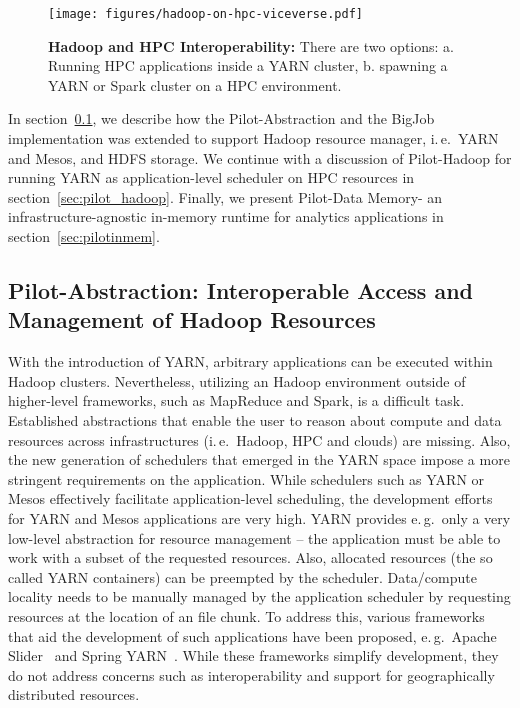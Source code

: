 \documentclass{sig-alternate}
\newcommand{\pilot}{Pilot\xspace}
\newcommand{\pilotdatainmem}{Pilot-Data Memory\xspace}
\begin{document}
\begin{figure}[t]
    \centering
    \texttt{[image: figures/hadoop-on-hpc-viceverse.pdf]}
    \caption{\textbf{Hadoop and HPC Interoperability:} There are two options: 
    a. Running HPC applications inside a YARN 
    cluster, b. spawning a YARN or Spark cluster on a HPC 
    environment.
    \label{fig:figures_hadoop-on-hpc-viceverse}}
\end{figure}

In section~\ref{sec:interop}, we describe how the \pilot-Abstraction and the
BigJob implementation was extended to support Hadoop resource manager, i.\,e.\
YARN and Mesos, and HDFS storage. We continue with a discussion of
\pilot-Hadoop for running YARN as application-level scheduler on HPC
resources in section~\ref{sec:pilot_hadoop}. Finally, we present
\pilotdatainmem - an infrastructure-agnostic in-memory runtime for analytics
applications in section~\ref{sec:pilotinmem}.


\subsection{Pilot-Abstraction: Interoperable Access and Management of Hadoop Resources}
\label{sec:interop}




With the introduction of YARN, arbitrary applications can be executed within
Hadoop clusters. Nevertheless, utilizing an Hadoop environment outside of
higher-level frameworks, such as MapReduce and Spark, is a difficult task.
Established abstractions that enable the user to reason about compute and data
resources across infrastructures (i.\,e.\ Hadoop, HPC and clouds) are missing.
Also, the new generation of schedulers that emerged in the YARN space impose a
more stringent requirements on the application. While schedulers such as YARN
or Mesos effectively facilitate application-level scheduling, the development
efforts for YARN and Mesos applications are very high. YARN provides e.\,g.\
only a very low-level abstraction for resource management -- the application
must be able to work with a subset of the requested resources. Also, allocated
resources (the so called YARN containers) can be preempted by the scheduler.
Data/compute locality needs to be manually managed by the application scheduler
by requesting resources at the location of an file chunk. To address this,
various frameworks that aid the development of such applications have been
proposed, e.\,g.\ Apache Slider~\cite{apache-slider} and Spring
YARN~\cite{spring-yarn}. While these frameworks simplify development, they do
not address concerns such as interoperability and support for geographically
distributed resources.
\end{document}
